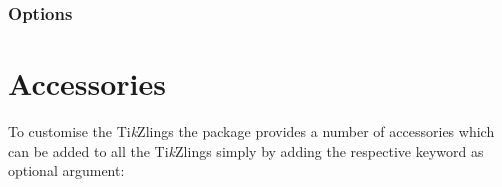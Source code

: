 \documentclass[parskip=half]{scrartcl}
\newcommand{\tikzlings}{Ti\emph{k}Zlings\xspace}
\begin{document}
\begin{tcblisting}{}
\penguin
\end{tcblisting}

\subsubsection{Options}

\begin{tcblisting}{}
\penguin[body=SteelBlue]
\end{tcblisting}

\begin{tcblisting}{}
\penguin[belly=red]
\end{tcblisting}

\begin{tcblisting}{}
\penguin[feet=red]
\end{tcblisting}

\begin{tcblisting}{}
\penguin[bill=red]
\end{tcblisting}

\begin{tcblisting}{}
\penguin[eye=red]
\end{tcblisting}

\begin{tcblisting}{}
\penguin[pupil=red]
\end{tcblisting}

\begin{tcblisting}{}
\penguin[3D]
\end{tcblisting}

\clearpage
\section{Accessories}

To customise the \tikzlings the package provides a number of accessories which can be added to all the \tikzlings simply by adding the respective keyword as optional argument:

\begin{tcblisting}{}
\bear[hat]
\end{tcblisting}
 
\end{document}
